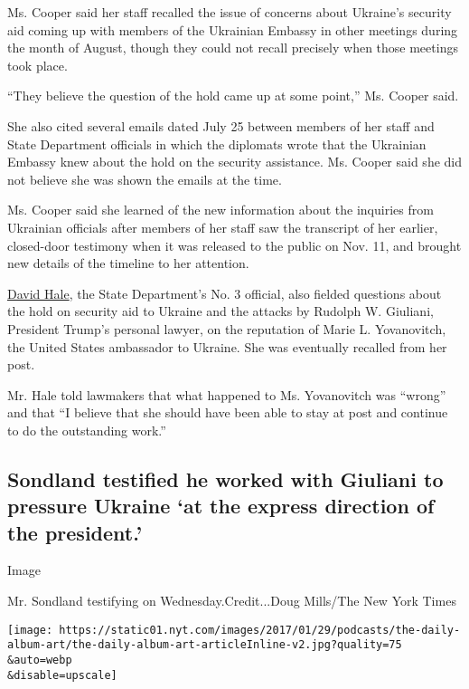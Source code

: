 Ms. Cooper said her staff recalled the issue of concerns about Ukraine's
security aid coming up with members of the Ukrainian Embassy in other
meetings during the month of August, though they could not recall
precisely when those meetings took place.

``They believe the question of the hold came up at some point,'' Ms.
Cooper said.

She also cited several emails dated July 25 between members of her staff
and State Department officials in which the diplomats wrote that the
Ukrainian Embassy knew about the hold on the security assistance. Ms.
Cooper said she did not believe she was shown the emails at the time.

Ms. Cooper said she learned of the new information about the inquiries
from Ukrainian officials after members of her staff saw the transcript
of her earlier, closed-door testimony when it was released to the public
on Nov. 11, and brought new details of the timeline to her attention.

\href{https://www.nytimes.com/2019/11/20/us/politics/david-hale-impeachment.html}{David
Hale}, the State Department's No. 3 official, also fielded questions
about the hold on security aid to Ukraine and the attacks by Rudolph W.
Giuliani, President Trump's personal lawyer, on the reputation of Marie
L. Yovanovitch, the United States ambassador to Ukraine. She was
eventually recalled from her post.

Mr. Hale told lawmakers that what happened to Ms. Yovanovitch was
``wrong'' and that ``I believe that she should have been able to stay at
post and continue to do the outstanding work.''

\hypertarget{sondland-testified-he-worked-with-giuliani-to-pressure-ukraine-at-the-express-direction-of-the-president}{%
\subsection{Sondland testified he worked with Giuliani to pressure
Ukraine `at the express direction of the
president.'}\label{sondland-testified-he-worked-with-giuliani-to-pressure-ukraine-at-the-express-direction-of-the-president}}

Image

Mr. Sondland testifying on Wednesday.Credit...Doug Mills/The New York
Times

\texttt{[image: https://static01.nyt.com/images/2017/01/29/podcasts/the-daily-album-art/the-daily-album-art-articleInline-v2.jpg?quality=75\\\&auto=webp\\\&disable=upscale]}

